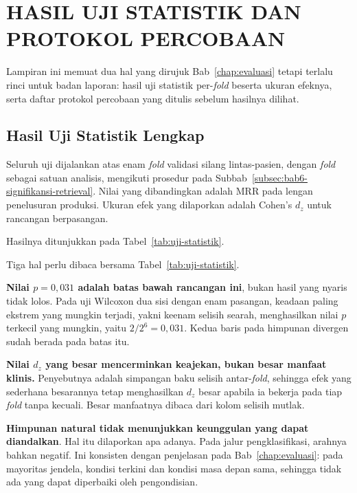 \cleardoublepage
\chapter{HASIL UJI STATISTIK DAN PROTOKOL PERCOBAAN}
\label{lamp:statistik}

Lampiran ini memuat dua hal yang dirujuk Bab~\ref{chap:evaluasi} tetapi terlalu rinci untuk badan laporan: hasil uji statistik per-\emph{fold} beserta ukuran efeknya, serta daftar protokol percobaan yang ditulis sebelum hasilnya dilihat.

\section{Hasil Uji Statistik Lengkap}
\label{lamp:uji-statistik}

Seluruh uji dijalankan atas enam \emph{fold} validasi silang lintas-pasien, dengan \emph{fold} sebagai satuan analisis, mengikuti prosedur pada Subbab~\ref{subsec:bab6-signifikansi-retrieval}. Nilai yang dibandingkan adalah MRR pada lengan penelusuran produksi. Ukuran efek yang dilaporkan adalah Cohen's $d_z$ untuk rancangan berpasangan.

Hasilnya ditunjukkan pada Tabel~\ref{tab:uji-statistik}.



Tiga hal perlu dibaca bersama Tabel~\ref{tab:uji-statistik}.

\textbf{Nilai $p=0{,}031$ adalah batas bawah rancangan ini}, bukan hasil yang nyaris tidak lolos. Pada uji Wilcoxon dua sisi dengan enam pasangan, keadaan paling ekstrem yang mungkin terjadi, yakni keenam selisih searah, menghasilkan nilai $p$ terkecil yang mungkin, yaitu $2/2^{6}=0{,}031$. Kedua baris pada himpunan divergen sudah berada pada batas itu.

\textbf{Nilai $d_z$ yang besar mencerminkan keajekan, bukan besar manfaat klinis.} Penyebutnya adalah simpangan baku selisih antar-\emph{fold}, sehingga efek yang sederhana besarannya tetap menghasilkan $d_z$ besar apabila ia bekerja pada tiap \emph{fold} tanpa kecuali. Besar manfaatnya dibaca dari kolom selisih mutlak.

\textbf{Himpunan natural tidak menunjukkan keunggulan yang dapat diandalkan}. Hal itu dilaporkan apa adanya. Pada jalur pengklasifikasi, arahnya bahkan negatif. Ini konsisten dengan penjelasan pada Bab~\ref{chap:evaluasi}: pada mayoritas jendela, kondisi terkini dan kondisi masa depan sama, sehingga tidak ada yang dapat diperbaiki oleh pengondisian.


